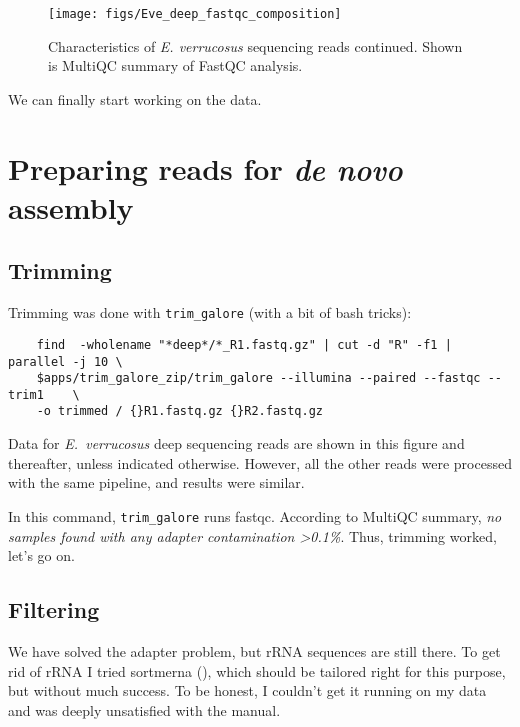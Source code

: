 \documentclass[12pt]{article}
\begin{document}
\begin{figure}[H]
\texttt{[image: figs/Eve\_deep\_fastqc\_composition]}
\caption{Characteristics of \textit{E. verrucosus} sequencing reads continued. Shown is MultiQC summary of FastQC analysis.} %
\label{Eve_deep_fastqc_composition}
\end{figure}
		

We can finally start working on the data.


		
\section{Preparing reads for \textit{de novo} assembly}

\subsection{Trimming}

Trimming was done with \verb|trim_galore| (with a bit of bash tricks):

\begin{verbatim}
	find  -wholename "*deep*/*_R1.fastq.gz" | cut -d "R" -f1 | parallel -j 10 \
	$apps/trim_galore_zip/trim_galore --illumina --paired --fastqc --trim1    \
	-o trimmed / {}R1.fastq.gz {}R2.fastq.gz
\end{verbatim}

Data for \textit{E.~verrucosus} deep sequencing reads are shown in this figure and thereafter, unless indicated otherwise. However, all the other reads were processed with the same pipeline, and results were similar.

In this command, \verb|trim_galore| runs fastqc. According to MultiQC summary, \textit{no samples found with any adapter contamination \textgreater 0.1\%}. Thus, trimming worked, let's go on.

\subsection{Filtering} \label{Filtering}

We have solved the adapter problem, but rRNA sequences are still there. 
To get rid of rRNA I tried sortmerna (\cite{Kopylova2012}), which should be tailored right for this purpose, but without much success. To be honest, I couldn't get it running on my data and was deeply unsatisfied with the manual.
\end{document}
